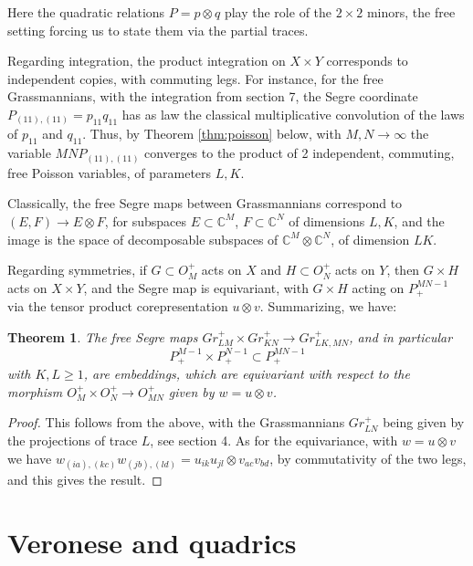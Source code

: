 \documentclass[11pt]{article}
\theoremstyle{plain}
\newtheorem{theorem}{Theorem}[section]
\begin{document}
Here the quadratic relations $P=p\otimes q$ play the role of the $2\times2$ minors, the free setting forcing us to state them via the partial traces.

\bigskip

Regarding integration, the product integration on $X\times Y$ corresponds to independent copies, with commuting legs. For instance, for the free Grassmannians, with the integration from section 7, the Segre coordinate $P_{(11),(11)}=p_{11}q_{11}$ has as law the classical multiplicative convolution of the laws of $p_{11}$ and $q_{11}$. Thus, by Theorem \ref{thm:poisson} below, with $M,N\to\infty$ the variable $MNP_{(11),(11)}$ converges to the product of 2 independent, commuting, free Poisson variables, of parameters $L,K$.

\bigskip

Classically, the free Segre maps between Grassmannians correspond to $(E,F)\to E\otimes F$, for subspaces $E\subset\mathbb C^M$, $F\subset\mathbb C^N$ of dimensions $L,K$, and the image is the space of decomposable subspaces of $\mathbb C^M\otimes\mathbb C^N$, of dimension $LK$.

\bigskip

Regarding symmetries, if $G\subset O_M^+$ acts on $X$ and $H\subset O_N^+$ acts on $Y$, then $G\times H$ acts on $X\times Y$, and the Segre map is equivariant, with $G\times H$ acting on $P^{MN-1}_+$ via the tensor product corepresentation $u\otimes v$. Summarizing, we have:

\begin{theorem}
\label{thm:segre}
The free Segre maps $Gr^+_{LM}\times Gr^+_{KN}\to Gr^+_{LK,MN}$, and in particular
$$P^{M-1}_+\times P^{N-1}_+\subset P^{MN-1}_+$$
with $K,L\geq1$, are embeddings, which are equivariant with respect to the morphism $O_M^+\times O_N^+\to O_{MN}^+$ given by $w=u\otimes v$.
\end{theorem}

\begin{proof}
This follows from the above, with the Grassmannians $Gr^+_{LN}$ being given by the projections of trace $L$, see section 4. As for the equivariance, with $w=u\otimes v$ we have $w_{(ia),(kc)}w_{(jb),(ld)}=u_{ik}u_{jl}\otimes v_{ac}v_{bd}$, by commutativity of the two legs, and this gives the result.
\end{proof}

\section{Veronese and quadrics}
\end{document}
